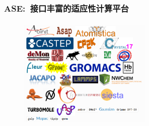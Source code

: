 \documentclass[cjk,slidestop,handout,compress,mathserif,blue]{beamer}	%
\begin{document}
%
\frame
{
	\frametitle{\textrm{ASE}:~接口丰富的适应性计算平台}
\begin{figure}[h!]
\centering
\vspace*{-0.2in}
\includegraphics[height=2.1in,width=2.5in,viewport=0 0 638 530,clip]{Figures/ASE_calculator.png}
\caption{\fontsize{7.2pt}{4.2pt}}%
\label{Logo_QM-MM}
\end{figure} 
}
\end{document}
